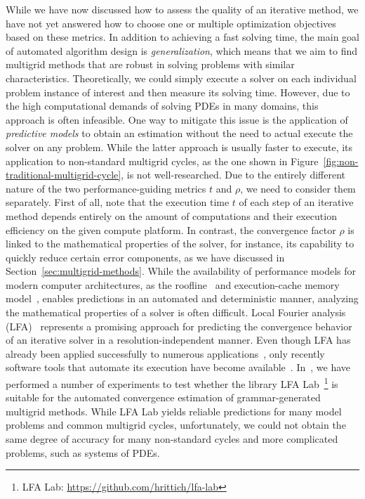 While we have now discussed how to assess the quality of an iterative method, we have not yet answered how to choose one or multiple optimization objectives based on these metrics.
In addition to achieving a fast solving time, the main goal of automated algorithm design is \emph{generalization}, which means that we aim to find multigrid methods that are robust in solving problems with similar characteristics.
Theoretically, we could simply execute a solver on each individual problem instance of interest and then measure its solving time.
However, due to the high computational demands of solving PDEs in many domains, this approach is often infeasible.
One way to mitigate this issue is the application of \emph{predictive models} to obtain an estimation without the need to actual execute the solver on any problem.
While the latter approach is usually faster to execute, its application to non-standard multigrid cycles, as the one shown in Figure~\ref{fig:non-traditional-multigrid-cycle}, is not well-researched.
Due to the entirely different nature of the two performance-guiding metrics $t$ and $\rho$, we need to consider them separately.
First of all, note that the execution time $t$ of each step of an iterative method depends entirely on the amount of computations and their execution efficiency on the given compute platform.
In contrast, the convergence factor $\rho$ is linked to the mathematical properties of the solver, for instance, its capability to quickly reduce certain error components, as we have discussed in Section~\ref{sec:multigrid-methods}. 
While the availability of performance models for modern computer architectures, as the roofline~\cite{williams2009roofline} and execution-cache memory model~\cite{hager2016exploring}, enables predictions in an automated and deterministic manner, analyzing the mathematical properties of a solver is often difficult.
Local Fourier analysis (LFA)~\cite{wienands2004practical} represents a promising approach for predicting the convergence behavior of an iterative solver in a resolution-independent manner.
Even though LFA has already been applied successfully to numerous applications~\cite{rodrigo2017validity}, only recently software tools that automate its execution have become available~\cite{rittich2018extending,kahl2020automated}.
In~\cite{schmitt2020constructing,hoefer2020comparing}, we have performed a number of experiments to test whether the library LFA Lab~\footnote{LFA Lab: \url{https://github.com/hrittich/lfa-lab}} is suitable for the automated convergence estimation of grammar-generated multigrid methods.
While LFA Lab yields reliable predictions for many model problems and common multigrid cycles, unfortunately, we could not obtain the same degree of accuracy for many non-standard cycles and more complicated problems, such as systems of PDEs.

